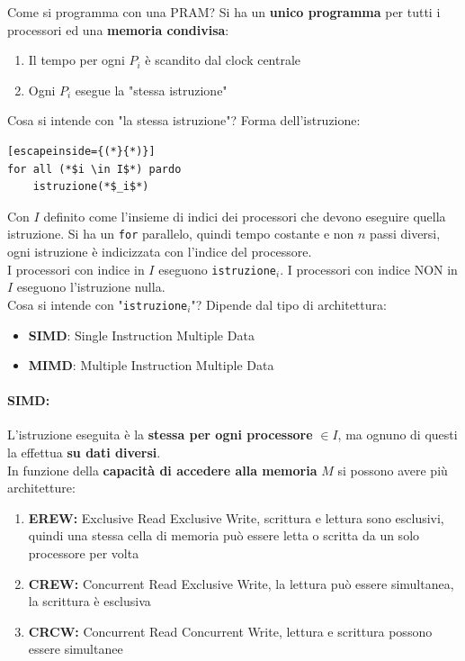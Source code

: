 \documentclass[11pt]{article}
\begin{document}
	Come si programma con una PRAM?  Si ha un \textbf{unico programma} per tutti i processori ed una \textbf{memoria condivisa}: 
	\begin{enumerate}
		\item Il tempo per ogni $P_i$ è scandito dal clock centrale
		\item Ogni $P_i$ esegue la "stessa istruzione"
	\end{enumerate}
	
	Cosa si intende con "la stessa istruzione"? Forma dell'istruzione:
	\begin{lstlisting}[escapeinside={(*}{*)}]
for all (*$i \in I$*) pardo
	istruzione(*$_i$*)
	\end{lstlisting}

	
	Con $I$ definito come l'insieme di indici dei processori che devono eseguire quella istruzione. Si ha un \texttt{for} parallelo, quindi tempo costante  e non $n$ passi diversi, ogni istruzione è indicizzata con l'indice del processore.\\
	
	I processori con indice in $I$ eseguono \texttt{istruzione}$_i$. I processori con indice NON in $I$ eseguono l'istruzione nulla.\\
	
	Cosa si intende con "\texttt{istruzione}$_i$"? Dipende dal tipo di architettura: 
	\begin{itemize}
		\item \textbf{SIMD}: Single Instruction Multiple Data
		\item \textbf{MIMD}: Multiple Instruction Multiple Data
	\end{itemize}
	
	\paragraph{SIMD:} L'istruzione eseguita è la \textbf{stessa per ogni processore} $\in I$, ma ognuno di questi la effettua \textbf{su dati diversi}.\\
	
	In funzione della \textbf{capacità di accedere alla memoria} $M$ si possono avere più architetture: 
	\begin{enumerate}
		\item \textbf{EREW:} Exclusive Read Exclusive Write, scrittura e lettura sono esclusivi, quindi una stessa cella di memoria può essere letta o scritta da un solo processore per volta
		\item \textbf{CREW:} Concurrent Read Exclusive Write, la lettura può essere simultanea, la scrittura è esclusiva
		\item \textbf{CRCW:} Concurrent Read Concurrent Write, lettura e scrittura possono essere simultanee
	\end{enumerate}
	
\end{document}
